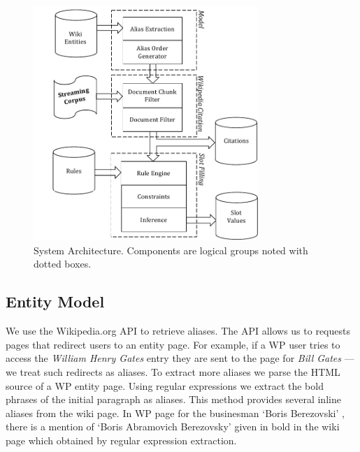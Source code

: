 \documentclass[letterpaper]{article}
\begin{document}
\begin{figure}
  \centering
  \includegraphics[width=8.5cm]{./images/System_Diagram_with_model_Vertical-crop.pdf}
  \caption{System Architecture.
  Components are logical groups noted with dotted boxes.}
  \label{fig:system}
\end{figure}



\subsection{Entity Model}
\label{sec:entitymodel}

We use the Wikipedia.org API to retrieve aliases. 
The API allows us to requests pages that redirect users to an entity page.
For example, if a WP user tries to access the \textsl{William Henry Gates} entry they are sent to the page for 
\textsl{Bill Gates} --- we treat  such redirects as aliases. 
To extract more aliases we parse the HTML source of a WP entity page.
Using regular expressions we extract the bold phrases of the initial paragraph as aliases.
This method provides several inline aliases from the wiki page.
In WP page for the businesman `Boris Berezovski' , there is a mention of `Boris Abramovich Berezovsky' given in bold in the wiki page which obtained by regular expression extraction.

\end{document}
